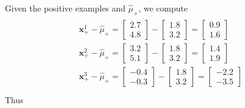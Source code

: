 \documentclass[leqno]{article}
\begin{document}
\noindent Given the positive examples and $\hat{\mu}_+$, we compute
\begin{gather*}
\begin{split}
&\textbf{x}_+^1 - \hat{\mu}_+ = 
\begin{bmatrix}
   2.7\\
   4.8 
\end{bmatrix} - 
\begin{bmatrix}
   1.8\\
   3.2 
\end{bmatrix} = 
\begin{bmatrix}
   0.9\\
   1.6 
\end{bmatrix}\\
&\textbf{x}_+^2 - \hat{\mu}_+ = 
\begin{bmatrix}
   3.2\\
   5.1 
\end{bmatrix} - 
\begin{bmatrix}
   1.8\\
   3.2 
\end{bmatrix} = 
\begin{bmatrix}
   1.4\\
   1.9 
\end{bmatrix}\\
&\textbf{x}_+^3 - \hat{\mu}_+ = 
\begin{bmatrix}
   -0.4\\
   -0.3 
\end{bmatrix} - 
\begin{bmatrix}
   1.8\\
   3.2 
\end{bmatrix} = 
\begin{bmatrix}
   -2.2\\
   -3.5 
\end{bmatrix}\\
\end{split}
\end{gather*}
Thus
\end{document}
